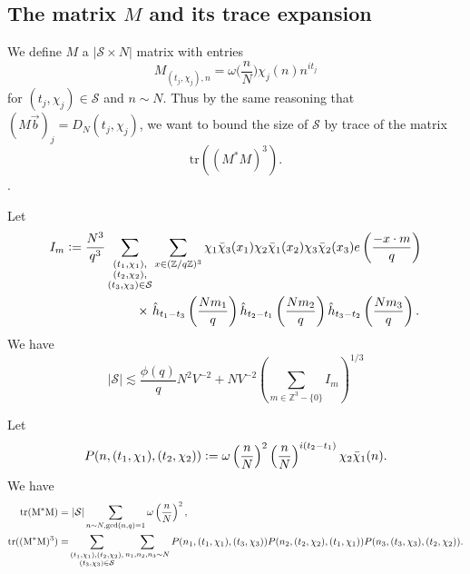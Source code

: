 \subsection{The matrix $M$ and its trace expansion}
We define $M$ a $|\mathcal{S}\times N|$ matrix with entries
\[
    M_{(t_j,\chi_j),n} = \omega\Big(\frac{n}{N}\Big)\chi_j(n)n^{it_j}
\]
for $(t_j,\chi_j)\in\mathcal{S}$ and $n\sim N$.
Thus by the same reasoning that $(M\vec{b})_j=D_N(t_j,\chi_j)$,
we want to bound the size of $\mathcal{S}$ by trace of the matrix \[
\textrm{tr}((M^*M)^3).
\].

\begin{proposition} \label{setup_poisson}
    Let  \begin{align*}
        I_m\defeq\frac{N^3}{q^3}\sum_{\substack{(t_1,\chi_1),\\(t_2,\chi_2),\\(t_3,\chi_3)\in\mathcal{S}}} &\sum_{x\in (\mathbb{Z}/q\mathbb{Z})^3}\chi_1\bar{\chi}_3(x_1)\chi_2\bar{\chi}_1(x_2)\chi_3\bar{\chi}_2(x_3) e\left(\frac{-x\cdot m}{q}\right)\\
        \times \ &\hat{h}_{t_1-t_3}\left(\frac{Nm_1}{q}\right)\hat{h}_{t_2-t_1}\left(\frac{Nm_2}{q}\right)\hat{h}_{t_3-t_2}\left(\frac{Nm_3}{q}\right).
    \end{align*}
    We have \[
    |\mathcal{S}|\lesssim \frac{\phi(q)}{q}N^2V^{-2}+ NV^{-2}\left(\sum_{m\in\mathbb{Z}^3 - \{0\}} I_m\right)^{1/3}
    \]
\end{proposition}
\begin{lemma}
    Let \[
    P(n,(t_1,\chi_1),(t_2,\chi_2))\mathrel{\mathop:}= \omega\left(\frac{n}{N}\right)^2 \left(\frac{n}{N}\right)^{i(t_2-t_1)}\chi_2\bar{\chi}_1(n).
    \]
    We have 
    \begin{align*}
        \rm{tr}(M^*M) = & \ |\mathcal{S}|\sum_{n\sim N, \gcd (n,q)=1} \omega\left(\frac{n}{N}\right)^2, \\
        \rm{tr}((M^*M)^3)=&\sum_{\substack{(t_1,\chi_1),(t_2,\chi_2),\\(t_3,\chi_3)\in\mathcal{S}}}\sum_{n_1,n_2,n_3\sim N} 
        P(n_1,(t_1,\chi_1),(t_3,\chi_3))P(n_2,(t_2,\chi_2),(t_1,\chi_1))P(n_3,(t_3,\chi_3),(t_2,\chi_2)).
    \end{align*}
\end{lemma}
